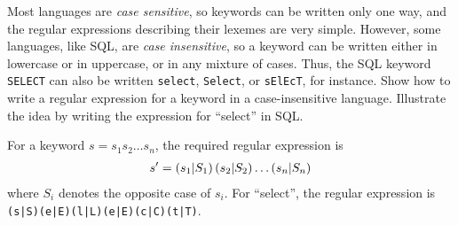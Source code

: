 \begin{exercise}\label{ex:030304}
    Most languages are \emph{case sensitive}, so keywords can be written only 
    one way, and the regular expressions describing their lexemes are very 
    simple. However, some languages, like SQL, are \emph{case insensitive}, so 
    a keyword can be written either in lowercase or in uppercase, or in any 
    mixture of cases. Thus, the SQL keyword \texttt{SELECT} can also be written 
    \texttt{select}, \texttt{Select}, or \texttt{sElEcT}, for instance. Show how 
    to write a regular expression for a keyword in a case-insensitive language.
    Illustrate the idea by writing the expression for ``select'' in SQL.
\end{exercise}
\begin{solution}\label{sol:030304}
    For a keyword $s = s_1s_2\ldots s_n$, the required regular expression is
    \begin{align*}
        s' = \left( s_1|S_1 \right)\left( s_2|S_2 \right)\ldots\left( s_n|S_n \right)
    \end{align*}
    where $S_i$ denotes the opposite case of $s_i$. For ``select'', the regular 
    expression is \texttt{(s|S)(e|E)(l|L)(e|E)(c|C)(t|T)}.
\end{solution}